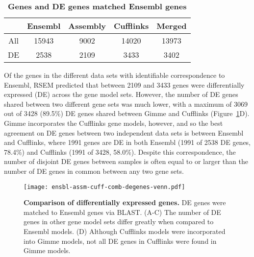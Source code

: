 \begin{table}[!ht]
\caption{
\textbf{Genes and DE genes matched Ensembl genes}}
\begin{center}
\begin{tabular}{ccccc}
\hline
& Ensembl & Assembly & Cufflinks & Merged \\
\hline
All & 15943 & 9002 & 14020 & 13973 \\
DE & 2538 & 2109 & 3433 & 3402 \\
\hline
\end{tabular}
\end{center}
\label{tab:ensbl_matched}
\end{table}

Of the genes in the different data sets with identifiable
correspondence to Ensembl, RSEM predicted that between 2109
and 3433 genes were differentially expressed (DE) across the
gene model sets.  However, the number of DE genes shared
between two different gene sets was much lower, with a
maximum of 3069 out of 3428 (89.5\%) DE genes shared between
Gimme and Cufflinks (Figure~\ref{degenes_venn}D).  Gimme
incorporates the Cufflinks gene models, however, and so the
best agreement on DE genes between two independent data sets
is between Ensembl and Cufflinks, where 1991 genes are DE in
both Ensembl (1991 of 2538 DE genes, 78.4\%) and Cufflinks
(1991 of 3428, 58.0\%).  Despite this correspondence, the
number of disjoint DE genes between samples is often equal
to or larger than the number of DE genes in common between
any two gene sets.

\begin{figure}[!ht]
    \begin{center}
        \texttt{[image: ensbl-assm-cuff-comb-degenes-venn.pdf]}
    \end{center}
    \caption{
        \textbf{Comparison of differentially expressed genes.}
        DE genes were matched to Ensembl genes via BLAST. (A-C) The number of DE
        genes in other gene model sets differ greatly when compared to Ensembl
        models.  (D) Although Cufflinks models were incorporated into Gimme
        models, not all DE genes in Cufflinks were found in Gimme models.
    }
    \label{degenes_venn}
\end{figure}


